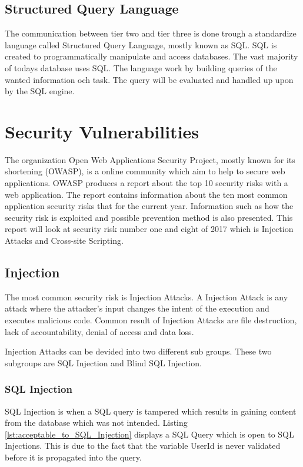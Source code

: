 \subsection{Structured Query Language}
The communication between tier two and tier three is done trough a standardize language called Structured Query Language, mostly known as SQL. SQL is created to programmatically manipulate and access databases. The vast majority of todays database uses SQL. The language work by building queries of the wanted information och task. The query will be evaluated and handled up upon by the SQL engine. \parencite{DarieCristian2003TPGt}


\section{Security Vulnerabilities}
The organization Open Web Applications Security Project, mostly known for its shortening (OWASP), is a online community which aim to help to secure web applications. \parencite{OpenWebApplicationSecurityProject} OWASP produces a report about the top 10 security risks with a web application. The report contains information about the ten most common application security risks that for the current year. Information such as how the security risk is exploited and possible prevention method is also presented. \parencite{OWASP2017} This report will look at security risk number one and eight of 2017 which is Injection Attacks and Cross-site Scripting. \parencite{OWASP2017} 


\subsection{Injection}
The most common security risk is Injection Attacks. \parencite{OWASP2017} A Injection Attack is any attack where the attacker's input changes the intent of the execution and executes malicious code. Common result of Injection Attacks are file destruction, lack of accountability, denial of access and data loss. \parencite{Secure_Web}

Injection Attacks can be devided into two different sub groups. These two subgroups are SQL Injection and Blind SQL Injection. \parencite{Secure_Web}


\subsubsection{SQL Injection}
SQL Injection is when a SQL query is tampered which results in gaining content from the database which was not intended. Listing \ref{lst:acceptable_to_SQL_Injection} displays a SQL Query which is open to SQL Injections. This is due to the fact that the variable UserId is never validated before it is propagated into the query. \parencite{JustinClarke-Salt2009SIAa, Secure_Web} 

